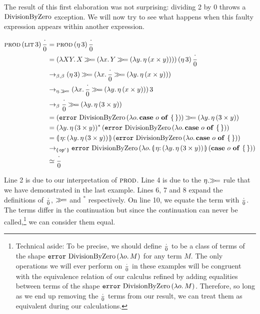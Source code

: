 The result of this first elaboration was not surprising: dividing 2 by 0
throws a $\operatorname{DivisionByZero}$ exception. We will now try to see what happens when
this faulty expression appears within another expression.

\NoChapterPrefix
\begin{align}
  \app{\prode}{\litec{3}}{\dbze}
  &= \app{\prode}{(\ap{\eta}{3})}{\dbze} \\
  &= \app{(\lam{X Y}{X \hsbind (\lam{x}{Y \hsbind (\lam{y}{\ap{\eta}
          {(x \times y)}})})})}
      {(\ap{\eta}{3})}{\dbze} \\
  &\to_{\beta,\beta} (\ap{\eta}{3}) \hsbind (\lam{x}{\dbze \hsbind (\lam{y}{\ap{\eta}
          {(x \times y)}})}) \\
  &\to_{\eta.\hsbind} \ap{(\lam{x}{\dbze \hsbind (\lam{y}{\ap{\eta}
          {(x \times y)}})})}{3} \\
  &\to_{\beta} \dbze \hsbind (\lam{y}{\ap{\eta} {(3 \times y)}}) \\
  &= (\app{\op{error}}{\dbzelong}{(\lam{o}{\absurd{o}})}) \hsbind (\lam{y}{\ap{\eta} {(3 \times y)}}) \\
  &= \ap{(\lam{y}{\ap{\eta} {(3 \times y)}})^*}{(\app{\op{error}}{\dbzelong}{(\lam{o}{\absurd{o}})})} \\
  &= \ap{\banana{\onto{\eta}{(\lam{y}{\ap{\eta} {(3 \times y)}})}}}{(\app{\op{error}}{\dbzelong}{(\lam{o}{\absurd{o}})})} \\
  &\to_{\banana{\op{op}'}} \app{\op{error}}{\dbzelong}{(\lam{o}{\ap{\banana{\onto{\eta}{(\lam{y}{\ap{\eta} {(3 \times y)}})}}}{(\absurd{o})}})} \\
  &\simeq \dbze
\end{align}
\setcounter{equation}{0}
\ChapterPrefix

Line 2 is due to our interpretation of $\textsc{prod}$. Line 4 is due to the
$\eta.\mathbin{\gg\!=}$ rule that we have demonstrated in the last example. Lines 6,
7 and 8 expand the definitions of $\frac{\cdot}{0}$, $\mathbin{\gg\!=}$ and $^*$
respectively. On line 10, we equate the term with $\frac{\cdot}{0}$. The terms differ
in the continuation but since the continuation can never be
called,\footnote{Technical aside: To be precise, we should define $\frac{\cdot}{0}$
  to be a class of terms of the shape
  $\mathtt{error}\,\operatorname{DivisionByZero}\,(\lambda o.\, M)$ for any term $M$. The only
  operations we will ever perform on $\frac{\cdot}{0}$ in these examples will be
  congruent with the equivalence relation of our calculus refined by adding
  equalities between terms of the shape
  $\mathtt{error}\,\operatorname{DivisionByZero}\,(\lambda o.\, M)$. Therefore, so long as we end up
  removing the $\frac{\cdot}{0}$ terms from our result, we can treat them as
  equivalent during our calculations.} we can consider them equal.

